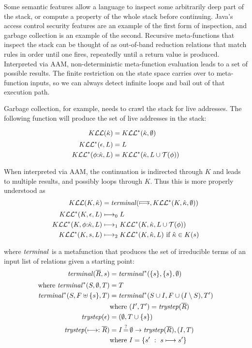 Some semantic features allow a language to inspect some arbitrarily deep part of the stack, or compute a property of the whole stack before continuing.
%
Java's access control security features are an example of the first form of inspection, and garbage collection is an example of the second.
%
Recursive meta-functions that inspect the stack can be thought of as out-of-band reduction relations that match rules in order until one fires, repeatedly until a return value is produced.
%
Interpreted via AAM, non-deterministic meta-function evaluation leads to a set of possible results.
%
The finite restriction on the state space carries over to meta-function inputs, so we can always detect infinite loops and bail out of that execution path.

Garbage collection, for example, needs to crawl the stack for live addresses.
The following function will produce the set of live addresses in the stack:

\begin{align*}
  K{\mathcal L}{\mathcal L}(\hat{\kappa}) &= K{\mathcal L}{\mathcal L}^*(\hat{\kappa},\emptyset) \\[2pt]
  K{\mathcal L}{\mathcal L}^*(\epsilon,L) &= L \\
  K{\mathcal L}{\mathcal L}^*(\phi{\tt :} \hat{\kappa}, L) &= K{\mathcal L}{\mathcal L}^*(\hat{\kappa}, L\cup{\mathcal T}(\phi))
\end{align*}

When interpreted via AAM, the continuation is indirected through $K$ and leads to multiple results, and possibly loops through $K$.
%
Thus this is more properly understood as
\begin{align*}
  K{\mathcal L}{\mathcal L}(K,\hat{\kappa}) &= \mathit{terminal}(\overline{\longmapsto},K{\mathcal L}{\mathcal L}^*(K,\hat{\kappa},\emptyset)) \\[2pt]
  K{\mathcal L}{\mathcal L}^*(K,\epsilon,L) &\longmapsto_0 L \\
  K{\mathcal L}{\mathcal L}^*(K,\phi{\tt :} \hat{\kappa}, L) &\longmapsto_1 K{\mathcal L}{\mathcal L}^*(K,\hat{\kappa}, L\cup{\mathcal T}(\phi)) \\
  K{\mathcal L}{\mathcal L}^*(K,s, L) &\longmapsto_2 K{\mathcal L}{\mathcal L}^*(K,\hat{\kappa},L) \text{ if } \hat{\kappa} \in K(s)
\end{align*}

where $\mathit{terminal}$ is a metafunction that produces the set of irreducible terms of an input list of relations given a starting point:
\begin{align*}
  \mathit{terminal}(\overline{R},s) &= \mathit{terminal}^*(\{ s \},\{ s \},\emptyset) \\[2pt]
  \text{where } \mathit{terminal}^*(S, \emptyset, T) &= T \\
   \mathit{terminal}^*(S, F \uplus \{ s \}, T) &= \mathit{terminal}^*(S\cup I, F \cup (I \setminus S), T') \\
   & \text{where } (I',T') = \mathit{trystep}(\overline{R}) \\
   \mathit{trystep}(\epsilon) &= (\emptyset,T\cup\{ s \}) \\
   \mathit{trystep}(\longmapsto:\overline{R}) &= I\operatorname*{\overset{?}{=}}\emptyset \to \mathit{trystep}(\overline{R}), (I, T) \\
    & \text{where } I = \{ s'\ :\ s \longmapsto s'\}
\end{align*}

